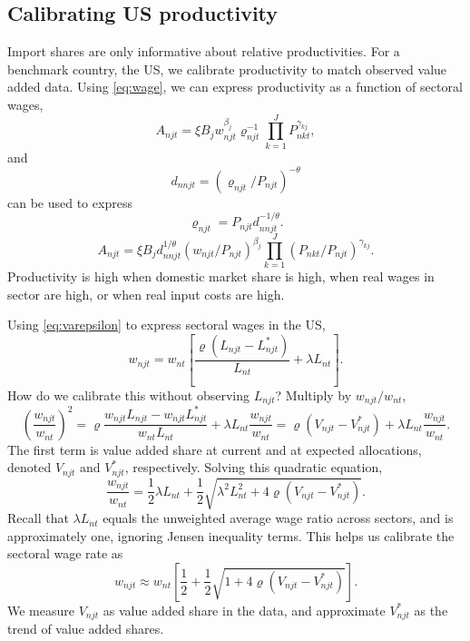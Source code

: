 \documentclass[12pt]{article}
\begin{document}
\subsection{Calibrating US productivity}
Import shares are only informative about relative productivities. For a benchmark country, the US, we calibrate productivity to match observed value added data. Using \eqref{eq:wage}, we can express productivity as a function of sectoral wages,
\begin{equation*}\label{eq:value_added}
A_{njt} =
	\xi B_j
	w_{njt}^{\beta_j}
	\varrho_{njt}^{-1}  	
	\prod_{k=1}^J P_{nkt}^{\gamma_{kj}},
\end{equation*}
and
\[
d_{nnjt} = (\varrho_{njt}/P_{njt})^{-\theta}
\]
can be used to express
\[
\varrho_{njt} = P_{njt} d_{nnjt}^{-1/\theta}.
\]
\begin{equation}\label{eq:productivity}
A_{njt} =
	\xi B_j
	d_{nnjt}^{1/\theta}
	(w_{njt}/P_{njt})^{\beta_j}
 	\prod_{k=1}^J (P_{nkt}/P_{njt})^{\gamma_{kj}}.
\end{equation}
Productivity is high when domestic market share is high, when real wages in sector are high, or when real input costs are high.

Using \eqref{eq:varepsilon} to express sectoral wages in the US,
\[
w_{njt} = w_{nt}
\left[
\frac {\varrho(L_{njt}-L_{njt}^*)}
	{L_{nt}}
+\lambda L_{nt}
\right].
\]
How do we calibrate this without observing $L_{njt}$? Multiply by $w_{njt}/w_{nt}$,
\[
\left(\frac {w_{njt}} {w_{nt}}\right)^2
= 
\varrho\frac {w_{njt}L_{njt}-w_{njt}L_{njt}^*}
	{w_{nt}L_{nt}}
+\lambda L_{nt}\frac {w_{njt}} {w_{nt}}
=\varrho (V_{njt} - V_{njt}^*)
+\lambda L_{nt}\frac {w_{njt}} {w_{nt}}.
\]
The first term is value added share at current and at expected allocations, denoted $V_{njt}$ and $V_{njt}^*$, respectively. Solving this quadratic equation,
\[
\frac {w_{njt}} {w_{nt}} = \frac12 \lambda L_{nt}
+\frac12 \sqrt{\lambda^2 L_{nt}^2 + 4\varrho (V_{njt}-V_{njt}^*)}.
\]
Recall that $\lambda L_{nt}$ equals the unweighted average wage ratio across sectors, and is approximately one, ignoring Jensen inequality terms. This helps us calibrate the sectoral wage rate as
\[
w_{njt} \approx w_{nt} \left[
\frac12
+\frac12 \sqrt{1 + 4\varrho (V_{njt}-V_{njt}^*)}
\right].
\]
We measure $V_{njt}$ as value added share in the data, and approximate $V_{njt}^*$ as the trend of value added shares.
\end{document}
